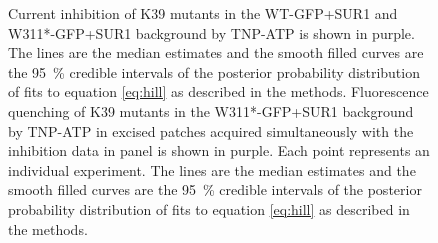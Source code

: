 \begin{figure}[hbtp]
\begin{subfigure}[t]{0.9\textwidth}
	\end{subfigure}
	\caption[Functional effects of K39 mutations on TNP-ATP binding and inhibition]{
	{\bf{}}
	 Current inhibition of K39 mutants in the WT-GFP+SUR1 and W311*-GFP+SUR1 background by TNP-ATP is shown in purple.
	The lines are the median estimates and the smooth filled curves are the \SI{95}{\percent} credible intervals of the posterior probability distribution of fits to equation \ref{eq:hill} as described in the methods.
	 Fluorescence quenching of K39 mutants in the W311*-GFP+SUR1 background by TNP-ATP in excised patches acquired simultaneously with the inhibition data in panel  is shown in purple.
	Each point represents an individual experiment.
	The lines are the median estimates and the smooth filled curves are the \SI{95}{\percent} credible intervals of the posterior probability distribution of fits to equation \ref{eq:hill} as described in the methods.
	}\label{ch5fig:k39_1b}
\end{figure}

